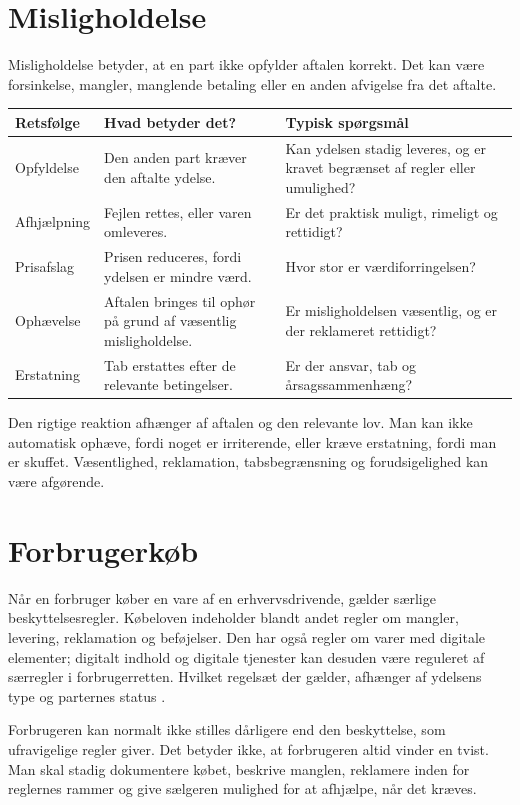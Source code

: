 \section{Misligholdelse}

Misligholdelse betyder, at en part ikke opfylder aftalen korrekt. Det kan være forsinkelse, mangler, manglende betaling eller en anden afvigelse fra det aftalte.

\begin{tabularx}{\textwidth}{@{}>{\RaggedRight\arraybackslash}p{2.4cm}X X@{}}
\toprule
\textbf{Retsfølge} & \textbf{Hvad betyder det?} & \textbf{Typisk spørgsmål} \\
\midrule
Opfyldelse & Den anden part kræver den aftalte ydelse. & Kan ydelsen stadig leveres, og er kravet begrænset af regler eller umulighed? \\
Afhjælpning & Fejlen rettes, eller varen omleveres. & Er det praktisk muligt, rimeligt og rettidigt? \\
Prisafslag & Prisen reduceres, fordi ydelsen er mindre værd. & Hvor stor er værdiforringelsen? \\
Ophævelse & Aftalen bringes til ophør på grund af væsentlig misligholdelse. & Er misligholdelsen væsentlig, og er der reklameret rettidigt? \\
Erstatning & Tab erstattes efter de relevante betingelser. & Er der ansvar, tab og årsagssammenhæng? \\
\bottomrule
\end{tabularx}

Den rigtige reaktion afhænger af aftalen og den relevante lov. Man kan ikke automatisk ophæve, fordi noget er irriterende, eller kræve erstatning, fordi man er skuffet. Væsentlighed, reklamation, tabsbegrænsning og forudsigelighed kan være afgørende.

\section{Forbrugerkøb}

Når en forbruger køber en vare af en erhvervsdrivende, gælder særlige beskyttelsesregler. Købeloven indeholder blandt andet regler om mangler, levering, reklamation og beføjelser. Den har også regler om varer med digitale elementer; digitalt indhold og digitale tjenester kan desuden være reguleret af særregler i forbrugerretten. Hvilket regelsæt der gælder, afhænger af ydelsens type og parternes status \citep{koebeloven}.

Forbrugeren kan normalt ikke stilles dårligere end den beskyttelse, som ufravigelige regler giver. Det betyder ikke, at forbrugeren altid vinder en tvist. Man skal stadig dokumentere købet, beskrive manglen, reklamere inden for reglernes rammer og give sælgeren mulighed for at afhjælpe, når det kræves.

